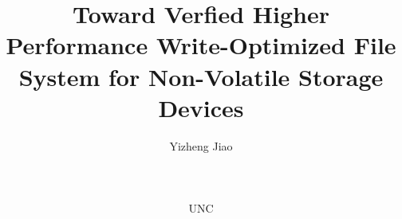 \title{Toward Verfied Higher Performance Write-Optimized File System for Non-Volatile Storage Devices}

\author{
    \begin{tabular}{ccccc} 
	Yizheng Jiao\\ 
    \end{tabular} \\
    \\
    \begin{tabular}{ccc} 
	{UNC}
    \end{tabular} 
}

\maketitle
\thispagestyle{empty}

\begin{abstract}
\end{abstract}
